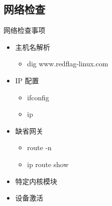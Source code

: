 %


\subsection{网络检查}

\begin{frame}{网络检查事项}
\begin{itemize}
\item 主机名解析
	\begin{itemize}
	\item dig www.redflag-linux.com
	\end{itemize}
\item IP 配置
	\begin{itemize}
	\item ifconfig
	\item ip
	\end{itemize}
\item 缺省网关
	\begin{itemize}
	\item route -n
	\item ip route show
	\end{itemize}
\item 特定内核模块
\item 设备激活
\end{itemize}
\end{frame} 


